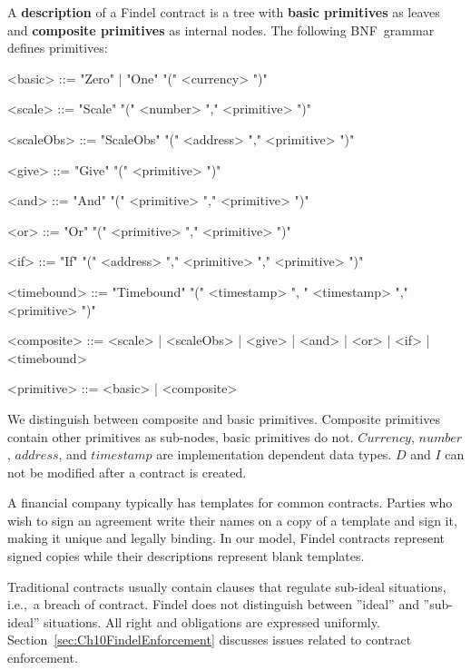 \begin{definition} \label{def:Ch10FindelDescription}
	A \textbf{description} of a Findel contract is a tree with \textbf{basic primitives} as leaves and \textbf{composite primitives} as internal nodes. The following BNF~grammar defines primitives:
	\begin{grammar}
		
		<basic> ::= "Zero" | "One" "(" <currency> ")"
		
		<scale> ::= "Scale" "(" <number> "," <primitive> ")"
		
		<scaleObs> ::= "ScaleObs" "(" <address> "," <primitive> ")"
		
		<give> ::= "Give" "(" <primitive> ")"
		
		<and> ::= "And" "(" <primitive> "," <primitive> ")"
		
		<or> ::= "Or" "(" <primitive> "," <primitive> ")"
		
		<if> ::= "If" "(" <address> "," <primitive> "," <primitive> ")"
		
		<timebound> ::= "Timebound" "(" <timestamp> ", " <timestamp> "," <primitive> ")"
		
		<composite> ::= <scale> | <scaleObs> | <give> | <and> | <or> | <if> | <timebound>
		
		<primitive> ::= <basic> | <composite>
		
	\end{grammar}
\end{definition}

We distinguish between composite and basic primitives.
Composite primitives contain other primitives as sub-nodes, basic primitives do not.
\(Currency\), \(number\), \(address\), and \(timestamp\) are implementation dependent data types.
$D$ and $I$ can not be modified after a contract is created.

A financial company typically has templates for common contracts.
Parties who wish to sign an agreement write their names on a copy of a template and sign it, making it unique and legally binding.
In our model, Findel contracts represent signed copies while their descriptions represent blank templates.

Traditional contracts usually contain clauses that regulate sub-ideal situations, i.e.,~a breach of contract.
Findel does not distinguish between ''ideal'' and ''sub-ideal'' situations.
All right and obligations are expressed uniformly.
Section~\ref{sec:Ch10FindelEnforcement} discusses issues related to contract enforcement.

